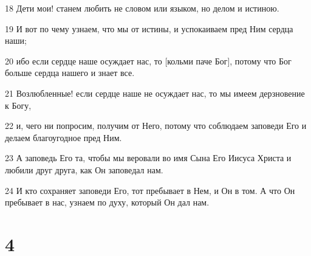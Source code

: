 \par 18 Дети мои! станем любить не словом или языком, но делом и истиною.
\par 19 И вот по чему узнаем, что мы от истины, и успокаиваем пред Ним сердца наши;
\par 20 ибо если сердце наше осуждает нас, то [кольми паче Бог], потому что Бог больше сердца нашего и знает все.
\par 21 Возлюбленные! если сердце наше не осуждает нас, то мы имеем дерзновение к Богу,
\par 22 и, чего ни попросим, получим от Него, потому что соблюдаем заповеди Его и делаем благоугодное пред Ним.
\par 23 А заповедь Его та, чтобы мы веровали во имя Сына Его Иисуса Христа и любили друг друга, как Он заповедал нам.
\par 24 И кто сохраняет заповеди Его, тот пребывает в Нем, и Он в том. А что Он пребывает в нас, узнаем по духу, который Он дал нам.

\chapter{4}


